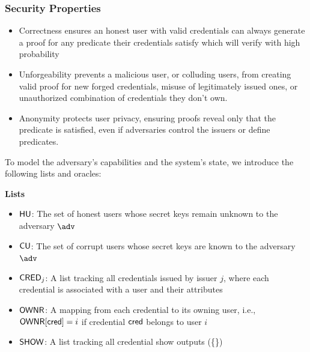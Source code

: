 
\subsubsection{Security Properties}

\begin{itemize}
    \item Correctness ensures an honest user with valid credentials can always generate a proof for any predicate their credentials satisfy which will verify with high probability

    \item Unforgeability prevents a malicious user, or colluding users, from creating valid proof for new forged credentials, misuse of legitimately issued ones, or unauthorized combination of credentials they don't own.

    \item Anonymity protects user privacy, ensuring proofs reveal only that the predicate is satisfied, even if adversaries control the issuers or define predicates. 
\end{itemize}

To model the adversary’s capabilities and the system’s state, we introduce the following lists and oracles:


\noindent\textbf{Lists}
\begin{itemize}
    \item $\mathsf{HU}$: The set of honest users whose secret keys remain unknown to the adversary $\adv$
    \item $\mathsf{CU}$: The set of corrupt users whose secret keys are known to the adversary $\adv$
    \item $\mathsf{CRED}_j$: A list tracking all credentials issued by issuer $j$, where each credential is associated with a user and their attributes
    \item $\mathsf{OWNR}$: A mapping from each credential to its owning user, i.e., $\mathsf{OWNR}[\mathsf{cred}] = i$ if credential $\mathsf{cred}$ belongs to user $i$
    \item $\mathsf{SHOW}$: A list tracking all credential show outputs (\{\})
\end{itemize} 

